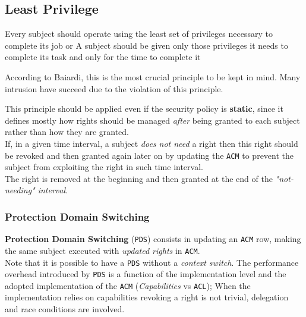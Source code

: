 \subsection{Least Privilege}

Every subject should operate using the least set of privileges
necessary to complete its job
or
A subject should be given only those privileges it needs to complete
its task and only for the time to complete it

According to Baiardi, this is the most crucial principle to be kept in mind.
Many intrusion have succeed due to the violation of this principle. 

This principle should be applied even if the security policy is
\textbf{static},
since it defines mostly how rights should be managed \textit{after} being
granted to each subject rather than how they are granted.\\
If, in a given time interval, a subject \textit{does not need} a right
then this right should be revoked and then granted again later on by
updating the \texttt{ACM} to prevent the subject from exploiting the right in such time interval.\\
The right is removed at the beginning and then granted at the
end of the \textit{"not-needing" interval}.

\subsubsection{Protection Domain Switching}
\textbf{Protection Domain Switching} (\texttt{PDS}) consists in updating an \texttt{ACM} row,
making the same subject executed
with \textit{updated rights} in \texttt{ACM}.\\
Note that it is possible to have a \texttt{PDS} without a \textit{context switch}.
The performance overhead introduced by \texttt{PDS} is a function of the
implementation level and the adopted implementation of the
\texttt{ACM} (\textit{Capabilities} vs \texttt{ACL});
When the implementation relies on capabilities revoking a right is not trivial,
delegation and race conditions are involved.

